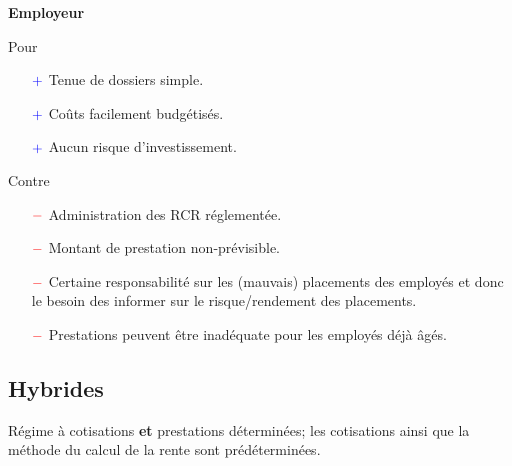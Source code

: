 \documentclass[10pt, french]{article}
\begin{document}
\begin{multicols*}{3}
\begin{center}
	\textbf{Employeur}
\end{center}
Pour
\begin{itemize}
	\item[$\color{blue}+$]	Tenue de dossiers simple.
	\item[$\color{blue}+$]	Coûts facilement budgétisés.
	\item[$\color{blue}+$]	Aucun risque d'investissement.
\end{itemize}

Contre
\begin{itemize}
	\item[$\color{red}-$]	Administration des RCR réglementée.
	\item[$\color{red}-$]	Montant de prestation non-prévisible.
	\item[$\color{red}-$]	Certaine responsabilité sur les (mauvais) placements des employés et donc le besoin des informer sur le risque/rendement des placements.
	\item[$\color{red}-$]	Prestations peuvent être inadéquate pour les employés déjà âgés.
\end{itemize}

\newpage

\subsection*{Hybrides}

\begin{definitionNOHFILL}[Description]
Régime à cotisations \textbf{et} prestations déterminées; les cotisations ainsi que la méthode du calcul de la rente sont prédéterminées.
\end{definitionNOHFILL}


\end{multicols*}
\end{document}
